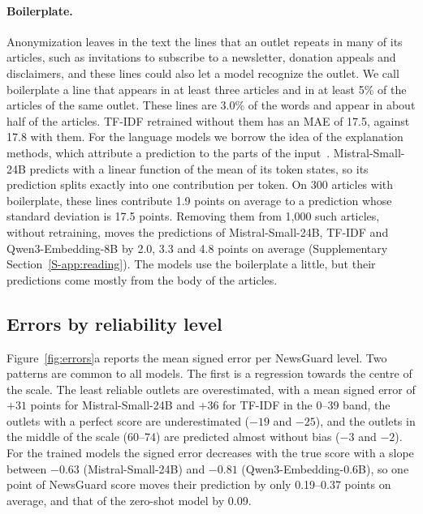 \documentclass[11pt,a4paper]{article}
\begin{document}
\paragraph{Boilerplate.} Anonymization leaves in the text the lines that an outlet repeats in many of its articles, such
as invitations to subscribe to a newsletter, donation appeals and disclaimers, and these lines could also let a model
recognize the outlet. We call boilerplate a line that appears in at least three articles and in at least 5\% of the
articles of the same outlet. These lines are 3.0\% of the words and appear in about half of the articles. TF-IDF
retrained without them has an MAE of 17.5, against 17.8 with them. For the language models we borrow the idea of the
explanation methods, which attribute a prediction to the parts of the input~\cite{kozik2024explainability}.
Mistral-Small-24B predicts with a linear function of the mean of its token states, so its prediction splits exactly
into one contribution per token. On 300 articles with boilerplate, these lines contribute 1.9 points on average to a
prediction whose standard deviation is 17.5 points. Removing them from 1,000 such articles, without retraining, moves
the predictions of Mistral-Small-24B, TF-IDF and Qwen3-Embedding-8B by 2.0, 3.3 and 4.8 points on average
(Supplementary Section~\ref{S-app:reading}). The models use the boilerplate a little, but their predictions come mostly
from the body of the articles.

\subsection{Errors by reliability level}\label{sec:errors}
Figure~\ref{fig:errors}a reports the mean signed error per NewsGuard level. Two patterns are common to all models. The
first is a regression towards the centre of the scale. The least reliable outlets are overestimated, with a mean signed
error of $+31$ points for Mistral-Small-24B and $+36$ for TF-IDF in the 0--39 band, the outlets with a perfect score are
underestimated ($-19$ and $-25$), and the outlets in the middle of the scale (60--74) are predicted almost without bias
($-3$ and $-2$). For the trained models the signed error decreases with the true score with a slope between $-0.63$
(Mistral-Small-24B) and $-0.81$ (Qwen3-Embedding-0.6B), so one point of NewsGuard score moves their prediction by only
0.19--0.37 points on average, and that of the zero-shot model by 0.09.
\end{document}
